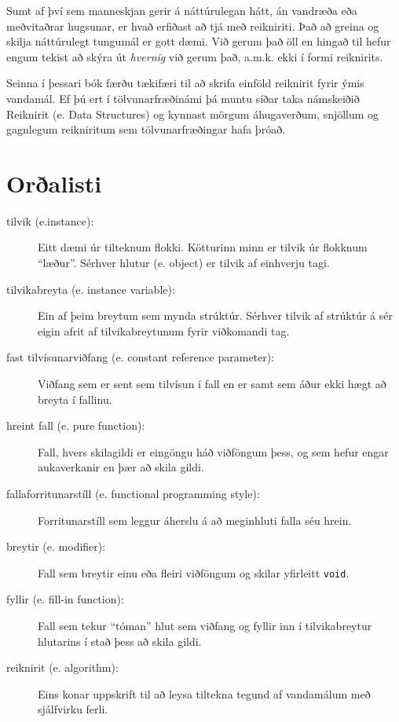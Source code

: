 Sumt af því sem manneskjan gerir á náttúrulegan hátt, án vandræða eða meðvitaðrar hugsunar, er hvað erfiðast að tjá með reikniriti.
Það að greina og skilja náttúrulegt tungumál er gott dæmi.
Við gerum það öll en hingað til hefur engum tekist að skýra út {\em hvernig} við gerum það, a.m.k. ekki í formi reiknirits.

Seinna í þessari bók færðu tækifæri til að skrifa einföld reiknirit fyrir ýmis vandamál.
Ef þú ert í tölvunarfræðinámi þá muntu síðar taka námskeiðið Reiknirit (e. Data Structures) og kynnast
mörgum áhugaverðum, snjöllum og gagnlegum reikniritum sem tölvunarfræðingar hafa þróað.

\section{Orðalisti}

\begin{description}

\item[tilvik (e.instance):]  Eitt dæmi úr tilteknum flokki.  Kötturinn minn er tilvik úr flokknum ``læður''. 
Sérhver hlutur (e. object) er tilvik af einhverju tagi.

\item[tilvikabreyta (e. instance variable):]  Ein af þeim breytum sem mynda strúktúr. Sérhver tilvik af strúktúr á sér eigin afrit af tilvikabreytunum fyrir viðkomandi tag.

\item[fast tilvísunarviðfang (e. constant reference parameter):]  Viðfang sem er sent sem tilvísun í fall en er samt sem áður ekki hægt að breyta í fallinu.

\item[hreint fall (e. pure function):]  Fall, hvers skilagildi er eingöngu háð viðföngum þess, og sem hefur engar aukaverkanir en þær að skila gildi.

\item[fallaforritunarstíll (e. functional programming style):]  Forritunarstíll sem leggur áherslu á að meginhluti falla séu hrein.

\item[breytir (e. modifier):]  Fall sem breytir einu eða fleiri viðföngum og skilar yfirleitt {\tt void}.

\item[fyllir (e. fill-in function):]  Fall sem tekur ``tóman'' hlut sem viðfang og fyllir inn í tilvikabreytur hlutarins í stað þess að skila gildi.

\item[reiknirit (e. algorithm):]  Eins konar uppskrift til að leysa tiltekna tegund af vandamálum með sjálfvirku ferli.


\end{description}

